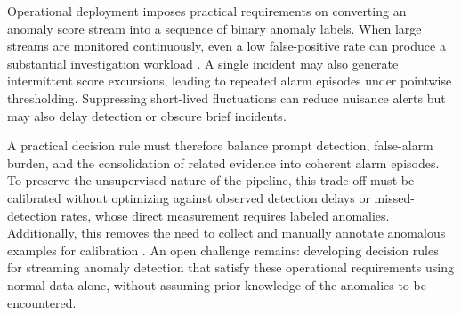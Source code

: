 Operational deployment imposes practical requirements on converting an anomaly score stream into a sequence of binary anomaly labels. When large streams are monitored continuously, even a low false-positive rate can produce a substantial investigation workload \cite{msl_smap_data}. A single incident may also generate intermittent score excursions, leading to repeated alarm episodes under pointwise thresholding. Suppressing short-lived fluctuations can reduce nuisance alerts but may also delay detection or obscure brief incidents.

A practical decision rule must therefore balance prompt detection, false-alarm burden, and the consolidation of related evidence into coherent alarm episodes. To preserve the unsupervised nature of the pipeline, this trade-off must be calibrated without optimizing against observed detection delays or missed-detection rates, whose direct measurement requires labeled anomalies. Additionally, this removes the need to collect and manually annotate anomalous examples for calibration \cite{expensivelabeling}. An open challenge remains: developing decision rules for streaming anomaly detection that satisfy these operational requirements using normal data alone, without assuming prior knowledge of the anomalies to be encountered.
